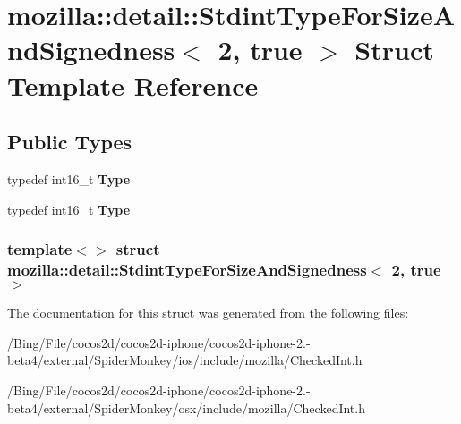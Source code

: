 \hypertarget{structmozilla_1_1detail_1_1_stdint_type_for_size_and_signedness_3_012_00_01true_01_4}{\section{mozilla\-:\-:detail\-:\-:Stdint\-Type\-For\-Size\-And\-Signedness$<$ 2, true $>$ Struct Template Reference}
\label{structmozilla_1_1detail_1_1_stdint_type_for_size_and_signedness_3_012_00_01true_01_4}
}
\subsection*{Public Types}
\begin{DoxyCompactItemize}
\item 
\hypertarget{structmozilla_1_1detail_1_1_stdint_type_for_size_and_signedness_3_012_00_01true_01_4_aef18a0d9d11a7458231f43aa3cea7d6b}{typedef int16\-\_\-t {\bfseries Type}}\label{structmozilla_1_1detail_1_1_stdint_type_for_size_and_signedness_3_012_00_01true_01_4_aef18a0d9d11a7458231f43aa3cea7d6b}

\item 
\hypertarget{structmozilla_1_1detail_1_1_stdint_type_for_size_and_signedness_3_012_00_01true_01_4_aef18a0d9d11a7458231f43aa3cea7d6b}{typedef int16\-\_\-t {\bfseries Type}}\label{structmozilla_1_1detail_1_1_stdint_type_for_size_and_signedness_3_012_00_01true_01_4_aef18a0d9d11a7458231f43aa3cea7d6b}

\end{DoxyCompactItemize}
\subsubsection*{template$<$$>$ struct mozilla\-::detail\-::\-Stdint\-Type\-For\-Size\-And\-Signedness$<$ 2, true $>$}



The documentation for this struct was generated from the following files\-:\begin{DoxyCompactItemize}
\item 
/\-Bing/\-File/cocos2d/cocos2d-\/iphone/cocos2d-\/iphone-\/2.-\/beta4/external/\-Spider\-Monkey/ios/include/mozilla/Checked\-Int.\-h\item 
/\-Bing/\-File/cocos2d/cocos2d-\/iphone/cocos2d-\/iphone-\/2.-\/beta4/external/\-Spider\-Monkey/osx/include/mozilla/Checked\-Int.\-h\end{DoxyCompactItemize}
